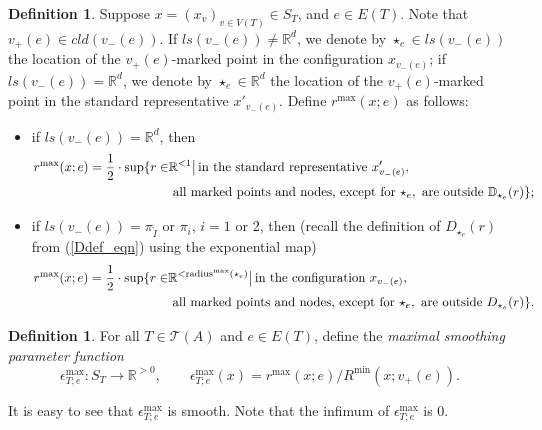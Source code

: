 \documentclass[11pt]{article}
\theoremstyle{definition}
\newtheorem{dfn}[thm]{Definition}
\theoremstyle{remark}
\def\R{\mathbb{R}}
\def\D{\mathbb{D}}
\def\cT{\mathcal{T}}
\def\rI{{\mathring{I}}}
\def\tn#1{\textnormal{#1}}
\begin{document}
\begin{dfn}\label{rmax_dfn}
Suppose $x=(x_v)_{v\in V(T)}\in S_T$, and $e\in E(T)$. Note that $v_+(e)\in cld(v_-(e))$. If $ls(v_-(e))\neq\R^d$, we denote by $\star_e\in ls(v_-(e))$ the location of the $v_+(e)$-marked point in the configuration $x_{v_-(e)}$; if $ls(v_-(e))=\R^d$, we denote by $\star_e\in\R^d$ the location of the $v_+(e)$-marked point in the standard representative $x'_{v_-(e)}$. 
Define $r^{\max}(x;e)$ as follows:
\begin{itemize}
\item if $ls(v_-(e))=\R^d$, then 
\begin{align*}
r^{\max}(x;e)=\frac{1}{2}\cdot\sup\{r\in&\R^{<1}\big|\,\tn{in the standard representative }x'_{v_-(e)},\\
&\tn{ all marked points and nodes, except for }\star_e, \tn{ are outside }\D_{\star_e}(r)\};
\end{align*}
\item if $ls(v_-(e))=\pi_\rI$ or $\pi_i$, $i=1$ or 2, 
then (recall the definition of $D_{\star_e}(r)$ from (\ref{Ddef_eqn}) using the exponential map)
\begin{align*}
r^{\max}(x;e)=\frac{1}{2}\cdot\sup\{r\in&\R^{<\tn{radius}^{\max}(\star_e)}\big|\,\tn{in the configuration }x_{v_-(e)},\\
&\tn{ all marked points and nodes, except for }\star_e, \tn{ are outside }D_{\star_e}(r)\}.
\end{align*}
\end{itemize}
\end{dfn}

\begin{dfn}
For all $T\in\cT(A)$ and $e\in E(T)$, define the {\it maximal smoothing parameter function}
$$\epsilon^{\max}_{T;e}:S_T\longrightarrow \R^{>0},\qquad \epsilon^{\max}_{T;e}(x)=r^{\max}(x;e)\big/R^{\min}(x;v_+(e)).$$
\end{dfn}
It is easy to see that $\epsilon^{\max}_{T;e}$ is smooth. Note that the infimum of $\epsilon^{\max}_{T;e}$ is 0. 

\end{document}

